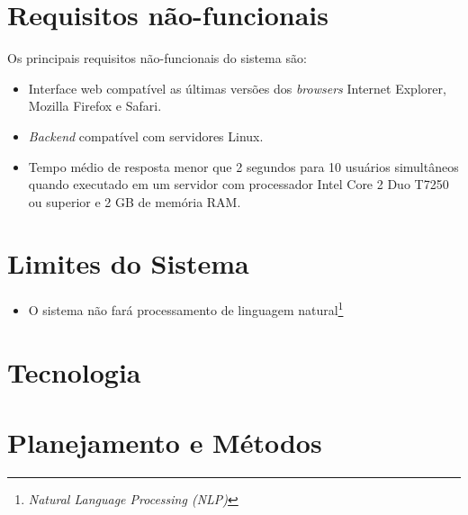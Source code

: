 \section{Requisitos não-funcionais}

Os principais requisitos não-funcionais do sistema são:

\begin{itemize}

    \item Interface web compatível as últimas versões dos \textit{browsers} Internet Explorer, Mozilla Firefox e Safari.
    
    \item \textit{Backend} compatível com servidores Linux.

    \item Tempo médio de resposta menor que 2 segundos para 10 usuários simultâneos quando executado em um servidor com processador Intel Core 2 Duo T7250 ou superior e 2 GB de memória RAM. %

\end{itemize}

\section{Limites do Sistema}

\begin{itemize}
    \item O sistema não fará processamento de linguagem natural\footnote{\textit{Natural Language Processing (NLP)}}

\end{itemize}

\section{Tecnologia} %
\label{sec:tecnologia}


\section{Planejamento e Métodos} %
\label{sec:planejamento_e_métodos}




